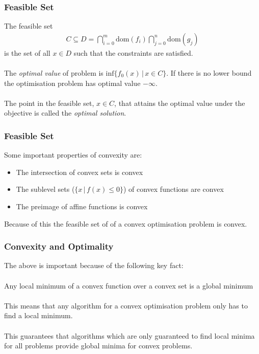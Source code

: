 \documentclass{beamer}
\begin{document}
\begin{frame}
    \frametitle{Feasible Set}
    The feasible set
    \begin{align*}
    C \subseteq D =
    \bigcap\limits_{i=0}^{m}\text{dom}(f_{i})\bigcap\limits_{j=0}^{n}\text{dom}(g_{j})
    \end{align*}
    is the set of all $x \in D$ such that the constraints are satisfied.
    \\~\\
    The \textit{optimal value} of problem is $\text{inf} \{f_{0}(x) \, | \, x
    \in C \}$. If there is no lower bound the optimisation problem has optimal
    value $-\infty$.
    \\~\\
    The point in the feasible set, $x \in C$, that attains the optimal value
    under the objective is called the \textit{optimal solution}.
\end{frame}

\begin{frame}
    \frametitle{Feasible Set}
    Some important properties of convexity are:
    \begin{itemize}
        \item The intersection of convex sets is convex
        \item The sublevel sets ($\{x \, | \, f(x) \leq 0 \}$) of convex
            functions are convex
        \item The preimage of affine functions is convex
    \end{itemize}
    Because of this the feasible set of of a convex optimisation problem is
    convex.
\end{frame}

\begin{frame}
    \frametitle{Convexity and Optimality}
    The above is important because of the following key fact:
    \\~\\
    Any local minimum of a convex function over a convex set is a global
    minimum
    \\~\\
    This means that any algorithm for a convex optimisation problem only has to
    find a local minimum.
    \\~\\
    This guarantees that algorithms which are only
    guaranteed to find local minima for all problems provide global minima for
    convex problems.
\end{frame}
\end{document}

